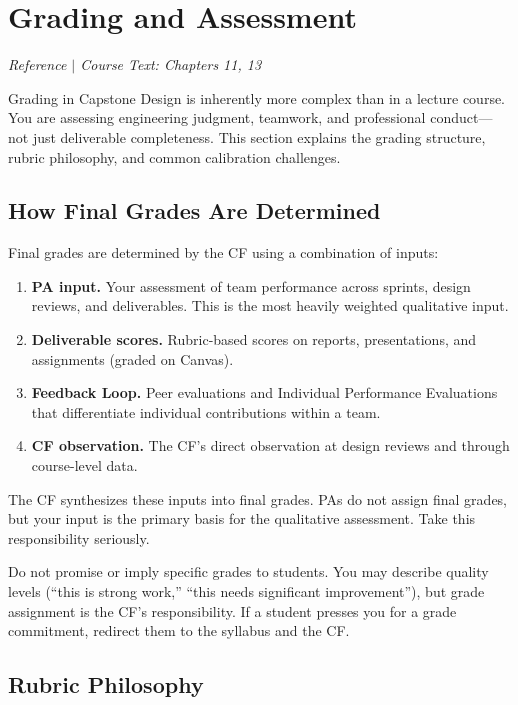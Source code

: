 \section{Grading and Assessment}
\textit{Reference $|$ Course Text: Chapters 11, 13}

Grading in Capstone Design is inherently more complex than in a lecture course. You are assessing engineering judgment, teamwork, and professional conduct---not just deliverable completeness. This section explains the grading structure, rubric philosophy, and common calibration challenges.

\subsection{How Final Grades Are Determined}

Final grades are determined by the CF using a combination of inputs:

\begin{enumerate}[nosep,leftmargin=1.5em]
\item \textbf{PA input.} Your assessment of team performance across sprints, design reviews, and deliverables. This is the most heavily weighted qualitative input.
\item \textbf{Deliverable scores.} Rubric-based scores on reports, presentations, and assignments (graded on Canvas).
\item \textbf{Feedback Loop.} Peer evaluations and Individual Performance Evaluations that differentiate individual contributions within a team.
\item \textbf{CF observation.} The CF's direct observation at design reviews and through course-level data.
\end{enumerate}

The CF synthesizes these inputs into final grades. PAs do not assign final grades, but your input is the primary basis for the qualitative assessment. Take this responsibility seriously.

\begin{warnbox}
Do not promise or imply specific grades to students. You may describe quality levels (``this is strong work,'' ``this needs significant improvement''), but grade assignment is the CF's responsibility. If a student presses you for a grade commitment, redirect them to the syllabus and the CF.
\end{warnbox}

\subsection{Rubric Philosophy}

